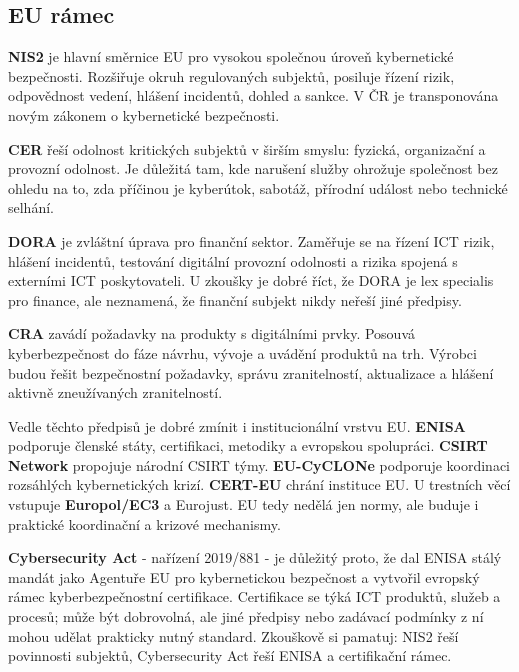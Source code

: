 \subsection*{EU rámec}
\textbf{NIS2} je hlavní směrnice EU pro vysokou společnou úroveň kybernetické bezpečnosti. Rozšiřuje okruh regulovaných subjektů, posiluje řízení rizik, odpovědnost vedení, hlášení incidentů, dohled a sankce. V ČR je transponována novým zákonem o kybernetické bezpečnosti.

\textbf{CER} řeší odolnost kritických subjektů v širším smyslu: fyzická, organizační a provozní odolnost. Je důležitá tam, kde narušení služby ohrožuje společnost bez ohledu na to, zda příčinou je kyberútok, sabotáž, přírodní událost nebo technické selhání.

\textbf{DORA} je zvláštní úprava pro finanční sektor. Zaměřuje se na řízení ICT rizik, hlášení incidentů, testování digitální provozní odolnosti a rizika spojená s externími ICT poskytovateli. U zkoušky je dobré říct, že DORA je lex specialis pro finance, ale neznamená, že finanční subjekt nikdy neřeší jiné předpisy.

\textbf{CRA} zavádí požadavky na produkty s digitálními prvky. Posouvá kyberbezpečnost do fáze návrhu, vývoje a uvádění produktů na trh. Výrobci budou řešit bezpečnostní požadavky, správu zranitelností, aktualizace a hlášení aktivně zneužívaných zranitelností.

Vedle těchto předpisů je dobré zmínit i institucionální vrstvu EU. \textbf{ENISA} podporuje členské státy, certifikaci, metodiky a evropskou spolupráci. \textbf{CSIRT Network} propojuje národní CSIRT týmy. \textbf{EU-CyCLONe} podporuje koordinaci rozsáhlých kybernetických krizí. \textbf{CERT-EU} chrání instituce EU. U trestních věcí vstupuje \textbf{Europol/EC3} a Eurojust. EU tedy nedělá jen normy, ale buduje i praktické koordinační a krizové mechanismy.

\textbf{Cybersecurity Act} - nařízení 2019/881 - je důležitý proto, že dal ENISA stálý mandát jako Agentuře EU pro kybernetickou bezpečnost a vytvořil evropský rámec kyberbezpečnostní certifikace. Certifikace se týká ICT produktů, služeb a procesů; může být dobrovolná, ale jiné předpisy nebo zadávací podmínky z ní mohou udělat prakticky nutný standard. Zkouškově si pamatuj: NIS2 řeší povinnosti subjektů, Cybersecurity Act řeší ENISA a certifikační rámec.

